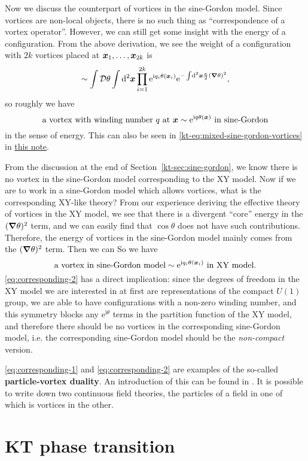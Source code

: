 \documentclass[hyperref, a4paper]{article}
\newcommand*{\ii}{\mathrm{i}}
\newcommand*{\ee}{\mathrm{e}}
\newcommand*{\fd}[1]{\mathcal{D} #1}
\newcommand*{\concept}[1]{{\textbf{#1}}}
\newcommand{\ktnote}{\href{../topological-phases-reading-notes/kt.pdf}{this note}}
\begin{document}
Now we discuss the counterpart of vortices in the sine-Gordon model. Since vortices are non-local objects,
there is no such thing as ``correspondence of a vortex operator''. However, we can still get some insight 
with the energy of a configuration. From the above derivation, we see the weight of a configuration with 
$2k$ vortices placed at $\vb*{x}_1, \ldots, \vb*{x}_{2k}$ is
\[
    \sim \int \fd{\theta} \int \dd[2]{\vb*{x}} \prod_{i=1}^{2k} \ee^{\ii q_i \theta(\vb*{x}_i)} \ee^{- \int \dd[2]{\vb*{x}} \frac{\kappa}{2} (\grad \theta)^2},
\]
so roughly we have  
\begin{equation}
    \text{a vortex with winding number $q$ at $\vb*{x}$} \sim \text{$\ee^{\ii q \theta(\vb*{x})}$ in sine-Gordon}
    \label{eq:corresponding-1}
\end{equation}
in the sense of energy. This can also be seen in \eqref{kt-eq:mixed-sine-gordon-vortices} in \ktnote. 

From the discussion at the end of Section~\ref{kt-sec:sine-gordon}, we know there is no vortex in the 
sine-Gordon model corresponding to the XY model. Now if we are to work in a sine-Gordon model which 
allows vortices, what is the corresponding XY-like theory? From our experience deriving the effective 
theory of vortices in the XY model, we see that there is a divergent ``core'' energy in the $(\grad \theta)^2$ 
term, and we can easily find that $\cos \theta$ does not have such contributions. Therefore, 
the energy of vortices in the sine-Gordon model mainly comes from the $(\grad \theta)^2$ term. 
Then we can %
So we have 
\begin{equation}
    \text{a vortex in sine-Gordon model} \sim \text{$\ee^{\ii q_i \theta(\vb*{x}_i)}$ in XY model}.
    \label{eq:corresponding-2}
\end{equation}
\eqref{eq:corresponding-2} has a direct implication: since the degrees of freedom in the XY model we are 
interested in at first are representations of the compact $U(1)$ group, we are able to have configurations 
with a non-zero winding number, and this symmetry blocks any $\ee^{\ii \theta}$ terms in the partition 
function of the XY model, and therefore there should be no vortices in the corresponding sine-Gordon 
model, i.e. the corresponding sine-Gordon model should be the \emph{non-compact} version.

\eqref{eq:corresponding-1} and \eqref{eq:corresponding-2} are examples of the so-called \concept{particle-vortex duality}.
An introduction of this can be found in \cite{tong2016lectures}. 
It is possible to write down two continuous field theories, the particles of a field in one of which is 
vortices in the other.

\section{KT phase transition}



 
\end{document}

